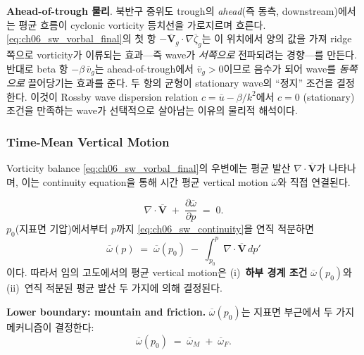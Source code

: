 \begin{hisublock}
\textbf{Ahead-of-trough 물리}.
북반구 중위도 trough의 \emph{ahead}(즉 동측, downstream)에서는
평균 흐름이 cyclonic vorticity 등치선을 가로지르며 흐른다.
\eqref{eq:ch06_sw_vorbal_final}의 첫 항 $-\overline{\mathbf{V}}_g\!\cdot\!\nabla\overline{\zeta}_g$는
이 위치에서 양의 값을 가져 ridge 쪽으로 vorticity가 이류되는 효과---즉 wave가
\emph{서쪽으로} 전파되려는 경향---를 만든다.
반대로 beta 항 $-\beta\,\overline{v}_g$는 ahead-of-trough에서 $\overline{v}_g > 0$이므로
음수가 되어 wave를 \emph{동쪽으로} 끌어당기는 효과를 준다.
두 항의 균형이 stationary wave의 ``정지'' 조건을 결정한다.
이것이 Rossby wave dispersion relation $c = \overline{u} - \beta/k^2$에서
$c = 0$ (stationary) 조건을 만족하는 wave가 선택적으로 살아남는 이유의 물리적 해석이다.
\end{hisublock}

\subsubsection{Time-Mean Vertical Motion}

Vorticity balance \eqref{eq:ch06_sw_vorbal_final}의 우변에는 평균 발산
$\nabla\!\cdot\!\overline{\mathbf{V}}$가 나타나며, 이는 continuity equation을 통해
시간 평균 vertical motion $\overline{\omega}$와 직접 연결된다.

\begin{equation}\label{eq:ch06_sw_continuity}
  \nabla\!\cdot\!\overline{\mathbf{V}} \;+\; \frac{\partial \overline{\omega}}{\partial p} \;=\; 0 .
\end{equation}
$p_0$(지표면 기압)에서부터 $p$까지 \eqref{eq:ch06_sw_continuity}을 연직 적분하면
\begin{equation}\label{eq:ch06_sw_omega_integral}
  \boxed{\;
  \overline{\omega}(p) \;=\; \overline{\omega}(p_0)
       \;-\; \int_{p_0}^{p} \nabla\!\cdot\!\overline{\mathbf{V}}\,dp'
  \;}
\end{equation}
이다. 따라서 임의 고도에서의 평균 vertical motion은
(i)~\textbf{하부 경계 조건} $\overline{\omega}(p_0)$와
(ii)~연직 적분된 평균 발산
두 가지에 의해 결정된다.

\medskip



\noindent\textbf{Lower boundary: mountain and friction.}
$\overline{\omega}(p_0)$는 지표면 부근에서 두 가지 메커니즘이 결정한다:
\begin{equation}\label{eq:ch06_sw_omega_lower}
  \overline{\omega}(p_0) \;=\; \overline{\omega}_M \;+\; \overline{\omega}_F .
\end{equation}

